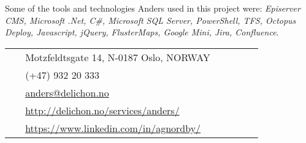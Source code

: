 \documentclass[10pt]{article} %
\begin{document}
\begin{paracol}{2}
{\qquad Some of the tools and technologies Anders used in this project were: \textit{Episerver CMS, Microsoft .Net, C\#, Microsoft SQL Server, PowerShell, TFS, Octopus Deploy, Javascript, jQuery, FlusterMaps, Google Mini, Jira, Confluence}.} 


\vspace{-\baselineskip}\medskip %

\switchcolumn %


\parbox[top][0.12\textheight][c]{\linewidth}{ %
	\vspace{-0.04\textheight} %
	\colorbox{shade}{ %
		\begin{supertabular}{p{0.05\linewidth}|p{0.775\linewidth}} %
			\raisebox{-1pt}{\faHome} & Motzfeldtsgate 14, N-0187 Oslo, NORWAY \\ %
			\raisebox{-1pt}{\faPhone} & (+47) 932 20 333 \\ %
			\raisebox{0pt}{\small\faEnvelope} & \href{mailto:anders@delichon.no}{anders@delichon.no} \\ %
			\raisebox{-1pt}{\small\faDesktop} & \href{http://delichon.no/services/anders/}{http://delichon.no/services/anders/} \\ %
			\raisebox{-1pt}{\faLinkedinSquare} & \href{https://www.linkedin.com/in/agnordby/}{https://www.linkedin.com/in/agnordby/} \\ %
		\end{supertabular}
	}
}


\end{paracol}
\end{document}
